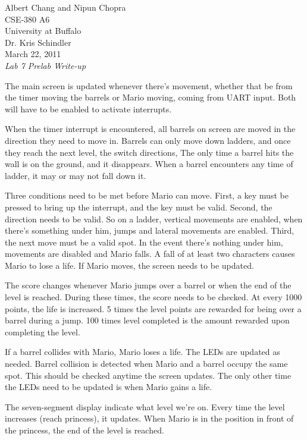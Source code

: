 \documentclass[letterpaper,10pt]{article}
\begin{document}
    Albert Chang and Nipun Chopra\\
    CSE-380 A6\\
    University at Buffalo\\
    Dr. Kris Schindler\\
    March 22, 2011\\
    \textit{Lab 7 Prelab Write-up}

    The main screen is updated whenever there's movement, whether that be from
    the timer moving the barrels or Mario moving, coming from UART input. Both
    will have to be enabled to activate interrupts.

    When the timer interrupt is encountered, all barrels on screen are moved in
    the direction they need to move in. Barrels can only move down ladders, and
    once they reach the next level, the switch directions, The only time a
    barrel hits the wall is on the ground, and it disappears. When a barrel
    encounters any time of ladder, it may or may not fall down it.

    Three conditions need to be met before Mario can move. First, a key must be
    pressed to bring up the interrupt, and the key must be valid. Second, the
    direction needs to be valid. So on a ladder, vertical movements are enabled,
    when there's something under him, jumps and lateral movements are enabled.
    Third, the next move must be a valid spot. In the event there's nothing
    under him, movements are disabled and Mario falls. A fall of at least two
    characters causes Mario to lose a life. If Mario moves, the screen needs
    to be updated.

    The score changes whenever Mario jumps over a barrel or when the end of
    the level is reached. During these times, the score needs to be checked. At
    every 1000 points, the life is increased. 5 times the level points are
    rewarded for being over a barrel during a jump. 100 times level completed
    is the amount rewarded upon completing the level.

    If a barrel collides with Mario, Mario loses a life. The LEDs are
    updated as needed. Barrel collision is detected when Mario and a barrel
    occupy the same spot. This should be checked anytime the screen updates.
    The only other time the LEDs need to be updated is when Mario gains a life.

    The seven-segment display indicate what level we're on. Every time the level
    increases (reach princess), it updates. When Mario is in the position in
    front of the princess, the end of the level is reached.
\end{document}
